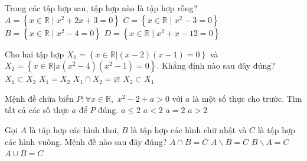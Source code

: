 \begin{ex}%
Trong các tập hợp sau, tập hợp nào là tập hợp rỗng?
\choice
{\True $A= \left\{ x \in \mathbb{R} \mid x^2+2x+3=0 \right\}$}
{$C= \left\{ x \in \mathbb{R} \mid x^2-3=0 \right\}$}
{$B= \left\{ x \in \mathbb{R} \mid x^2-4=0 \right\}$}
{$D= \left\{ x \in \mathbb{R} \mid x^2+x-12=0 \right\}$}
\end{ex}

\begin{ex}%
Cho hai tập hợp $ X_1=\left\lbrace x \in \mathbb{R}|(x-2)(x-1)=0\right\rbrace  $ và $ X_2=\left\lbrace x \in \mathbb{R}|x(x^2-4)(x^2-1)=0\right\rbrace  $. Khẳng định nào sau đây đúng?
\choice
{\True $ X_1 \subset X_2 $}
{$ X_1 =X_2$}
{$ X_1 \cap X_2=\varnothing $}
{$ X_2 \subset X_1$}
\end{ex}

\begin{ex}%
Mệnh đề chứa biến  $P:\forall x \in \mathbb{R},\,\,{x^2} - 2 + a > 0$ với $ a $ là một số thực cho trước. Tìm tất cả các số thực $ a $  để  $ P $ đúng.
\choice
{ $a \le 2$ }
{$a < 2$  }
{ $a = 2$ }
{\True $a > 2$ }
\end{ex}

\begin{ex} %
Gọi ${A}$ là tập hợp các hình thoi, ${B}$ là tập hợp các hình chữ nhật và ${C}$ là tập hợp các hình vuông. Mệnh đề nào sau đây đúng?
\choice
{ \True $A\cap B=C $}
{ $A\backslash B=C$}
{ $B\backslash A=C$}
{ ${A\cup B=C}$
}
\end{ex}

